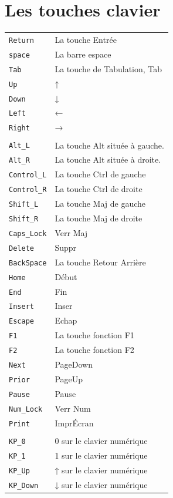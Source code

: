 \documentclass[11pt,a4paper]{article}
\begin{document}
\section{Les touches clavier}
\begin{tabular}{ll}
{\tt Return} 	& 	La touche Entrée\\
{\tt space} 	& 	La barre espace\\
{\tt Tab} 	& 	La touche de Tabulation, Tab\\

{\tt Up} 	& 	↑\\
{\tt Down} 	& 	↓\\
{\tt Left} 	& 	←\\
{\tt Right} 	& 	→\\
&\\
{\tt Alt\_L} 	& 	La touche Alt située à gauche.\\
{\tt Alt\_R} 	& 	La touche Alt située à droite.\\
{\tt Control\_L} 	& 	La touche Ctrl de gauche\\
{\tt Control\_R} 	& 	La touche Ctrl de droite\\
{\tt Shift\_L} 	& 	La touche Maj de gauche\\
{\tt Shift\_R} 	& 	La touche Maj de droite\\
{\tt Caps\_Lock} 	& 	Verr Maj\\
{\tt Delete} 	& 	Suppr\\
{\tt BackSpace} 	& 	La touche Retour Arrière\\
{\tt Home} 	& 	Début\\
{\tt End} 	& 	Fin\\
{\tt Insert} 	& 	Inser\\
{\tt Escape} 	& 	Echap\\
{\tt F1} 	& 	La touche fonction F1\\
{\tt F2} 	& 	La touche fonction F2\\
{\tt Next} 	& 	PageDown\\
{\tt Prior} 	& 	PageUp\\
{\tt Pause} 	& 	Pause\\
{\tt Num\_Lock} 	& 	Verr Num\\
{\tt Print} 	& 	ImprÉcran\\
&\\
{\tt KP\_0} 	& 	0 sur le clavier numérique\\
{\tt KP\_1} 	& 	1 sur le clavier numérique\\
{\tt KP\_Up} 	& 	↑ sur le clavier numérique\\
{\tt KP\_Down} 	& 	↓ sur le clavier numérique\\

\end{tabular}
\end{document}
